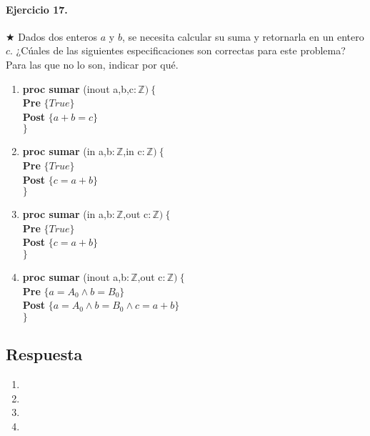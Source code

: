 \documentclass[a4paper]{article}
\begin{document}
\paragraph*{Ejercicio 17.} $\bigstar$ Dados dos enteros $a$ y $b$, se necesita calcular su suma y retornarla en un entero $c$. ¿Cúales de las siguientes especificaciones son correctas para este problema? Para las que no lo son, indicar por qué. 
	\begin{enumerate}[label=\alph*)]
		\item
			\textbf{proc sumar }(inout a,b,c$: \mathbb{Z})\ \{$\smallskip \\
			\hspace*{6mm} \textbf{Pre }$\{True\}$\smallskip \\
			\hspace*{6mm} \textbf{Post }$\{a+b=c\}$\\
			$\}$
		\item
			\textbf{proc sumar }(in a,b$: \mathbb{Z}$,in c$: \mathbb{Z})\ \{$\smallskip \\
			\hspace*{6mm} \textbf{Pre }$\{ True\}$\smallskip \\
			\hspace*{6mm} \textbf{Post }$\{c=a+b\}$\\
			$\}$
		\item
			\textbf{proc sumar }(in a,b$: \mathbb{Z}$,out c$: \mathbb{Z})\ \{$\smallskip \\
			\hspace*{6mm} \textbf{Pre }$\{ True\}$\smallskip \\
			\hspace*{6mm} \textbf{Post }$\{c=a+b\}$\\
			$\}$
		\item
			\textbf{proc sumar }(inout a,b$: \mathbb{Z}$,out c$: \mathbb{Z})\ \{$\smallskip \\
			\hspace*{6mm} \textbf{Pre }$\{ a=A_0\wedge b=B_0\}$\smallskip \\
			\hspace*{6mm} \textbf{Post }$\{ a=A_0\wedge b=B_0\wedge c=a+b\}$\\
			$\}$
	\end{enumerate}
\subsection*{Respuesta}
	\begin{enumerate}[label=\alph*)]
		\item
		\item
		\item
		\item
	\end{enumerate}
	
\end{document}

